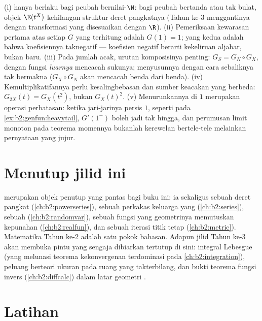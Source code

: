 \begin{remark}
(i)  hanya berlaku bagi peubah bernilai-$\N$:
bagi peubah bertanda atau tak bulat, objek $\E(t^X)$
kehilangan struktur deret pangkatnya (Tahun ke-3 menggantinya dengan
transformasi yang disesuaikan dengan $\R$). (ii) Pemeriksaan kewarasan pertama atas
setiap $G$ yang terhitung adalah $G(1) = 1$; yang kedua adalah bahwa
koefisiennya taknegatif --- koefisien negatif berarti
kekeliruan aljabar, bukan  baru. (iii) Pada jumlah acak,
urutan komposisinya penting: $G_S = G_N \circ G_X$, dengan
fungsi \emph{luarnya} mencacah sukunya; menyusunnya
dengan cara sebaliknya tak bermakna ($G_X \circ G_N$ akan mencacah benda
dari benda). (iv) Kemultiplikatifannya perlu kesalingbebasan dan
sumber keacakan yang berbeda: $G_{2X}(t) = G_X(t^2)$, bukan
$G_X(t)^2$. (v) Menurunkannya di $1$ merupakan operasi perbatasan:
ketika jari-jarinya persis $1$, seperti pada
\cref{ex:b2:genfun:heavytail}, $G'(1^-)$ boleh jadi tak hingga,
dan perumusan limit monoton pada teorema momennya bukanlah
kerewelan bertele-tele melainkan pernyataan yang jujur.
\end{remark}

\section*{Menutup jilid ini}

 merupakan objek penutup yang pantas bagi buku ini:
ia sekaligus sebuah deret pangkat (\cref{ch:b2:powerseries}), sebuah
perkakas keluarga yang  (\cref{ch:b2:series}), sebuah 
(\cref{ch:b2:randomvar}), sebuah fungsi  yang geometrinya memutuskan
kepunahan (\cref{ch:b2:realfun}), dan sebuah iterasi titik tetap
(\cref{ch:b2:metric}). Matematika Tahun ke-2 adalah satu pokok bahasan.
Adapun jilid Tahun ke-3 akan membuka pintu yang sengaja dibiarkan tertutup
di sini: integral Lebesgue (yang melunasi teorema kekonvergenan
terdominasi pada \cref{ch:b2:integration}), peluang berteori ukuran
pada ruang yang takterbilang, dan bukti  teorema fungsi
invers (\cref{ch:b2:diffcalc}) dalam latar geometri .

\section{Latihan}

